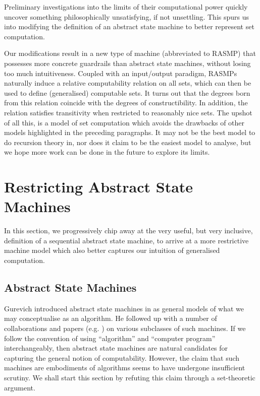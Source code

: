 \documentclass[12pt]{article}
\numberwithin{equation}{section}
\begin{document}
Preliminary investigations into the limits of their computational power quickly uncover something philosophically unsatisfying, if not unsettling. This spurs us into modifying the definition of an abstract state machine to better represent set computation.

Our modifications result in a new type of machine (abbreviated to RASMP) that possesses more concrete guardrails than abstract state machines, without losing too much intuitiveness. Coupled with an input/output paradigm, RASMPs naturally induce a relative computability relation on all sets, which can then be used to define (generalised) computable sets. It turns out that the degrees born from this relation coincide with the degrees of constructibility. In addition, the relation satisfies transitivity when restricted to reasonably nice sets. The upshot of all this, is a model of set computation which avoids the drawbacks of other models highlighted in the preceding paragraphs. It may not be the best model to do recursion theory in, nor does it claim to be the easiest model to analyse, but we hope more work can be done in the future to explore its limits.

\section{Restricting Abstract State Machines}\label{sect2}

In this section, we progressively chip away at the very useful, but very inclusive, definition of a sequential abstract state machine, to arrive at a more restrictive machine model which also better captures our intuition of generalised computation. 

\subsection{Abstract State Machines}

Gurevich introduced abstract state machines in \cite{gurevich} as general models of what we may conceptualise as an algorithm. He followed up with a number of collaborations and papers (e.g. \cite{gurevichblass}) on various subclasses of such machines. If we follow the convention of using ``algorithm'' and ``computer program'' interchangeably, then abstract state machines are natural candidates for capturing the general notion of computability. However, the claim that such machines are embodiments of algorithms seems to have undergone insufficient scrutiny. We shall start this section by refuting this claim through a set-theoretic argument. 
\end{document}
